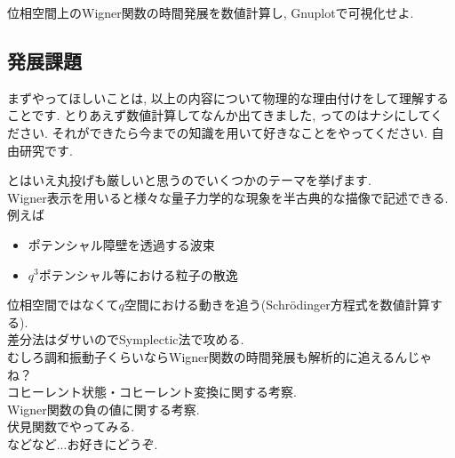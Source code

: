 \documentclass[10.5pt,a4paper]{jsarticle}
\begin{document}
 位相空間上のWigner関数の時間発展を数値計算し, Gnuplotで可視化せよ. 

\subsection{発展課題}
まずやってほしいことは, 以上の内容について物理的な理由付けをして理解することです. とりあえず数値計算してなんか出てきました, ってのはナシにしてください. それができたら今までの知識を用いて好きなことをやってください. 自由研究です.

とはいえ丸投げも厳しいと思うのでいくつかのテーマを挙げます. \\

 Wigner表示を用いると様々な量子力学的な現象を半古典的な描像で記述できる. 例えば
\begin{itemize}
\item ポテンシャル障壁を透過する波束
\item $q^3$ポテンシャル等における粒子の散逸
\end{itemize}

 位相空間ではなくて$q$空間における動きを追う(Schr\"odinger方程式を数値計算する).\\

 差分法はダサいのでSymplectic法で攻める.\\

 むしろ調和振動子くらいならWigner関数の時間発展も解析的に追えるんじゃね？\\

 コヒーレント状態・コヒーレント変換に関する考察. \\

 Wigner関数の負の値に関する考察.\\

 伏見関数でやってみる. \\

などなど...お好きにどうぞ. 
\end{document}
